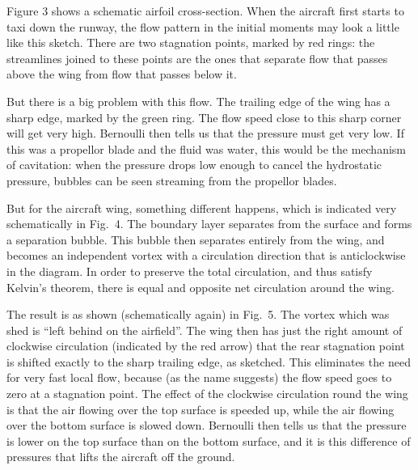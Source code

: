   Figure 3 shows a schematic airfoil cross-section. When the aircraft first 
  starts to taxi down the runway, the flow pattern in the initial moments may 
  look a little like this sketch. There are two stagnation points, marked by 
  red rings: the streamlines joined to these points are the ones that separate 
  flow that passes above the wing from flow that passes below it. 


  But there is a big problem with this flow. The trailing edge of the wing has 
  a sharp edge, marked by the green ring. The flow speed close to this sharp 
  corner will get very high. Bernoulli then tells us that the pressure must get 
  very low. If this was a propellor blade and the fluid was water, this would 
  be the mechanism of cavitation: when the pressure drops low enough to cancel 
  the hydrostatic pressure, bubbles can be seen streaming from the propellor 
  blades. 

  But for the aircraft wing, something different happens, which is indicated 
  very schematically in Fig.\ 4. The boundary layer separates from the surface 
  and forms a separation bubble. This bubble then separates entirely from the 
  wing, and becomes an independent vortex with a circulation direction that is 
  anticlockwise in the diagram. In order to preserve the total circulation, and 
  thus satisfy Kelvin's theorem, there is equal and opposite net circulation 
  around the wing. 


  The result is as shown (schematically again) in Fig.\ 5. The vortex which was 
  shed is ``left behind on the airfield''. The wing then has just the right 
  amount of clockwise circulation (indicated by the red arrow) that the rear 
  stagnation point is shifted exactly to the sharp trailing edge, as sketched. 
  This eliminates the need for very fast local flow, because (as the name 
  suggests) the flow speed goes to zero at a stagnation point. The effect of 
  the clockwise circulation round the wing is that the air flowing over the top 
  surface is speeded up, while the air flowing over the bottom surface is 
  slowed down. Bernoulli then tells us that the pressure is lower on the top 
  surface than on the bottom surface, and it is this difference of pressures 
  that lifts the aircraft off the ground. 

